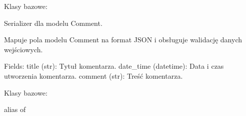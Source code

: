 \documentclass[letterpaper,11pt,polish]{sphinxmanual}
\begin{document}
\begin{fulllineitems}
\label{\detokenize{mainApp:mainApp.serializers.CommentSerializer}}
\pysigstartsignatures
{}
\pysigstopsignatures
\sphinxAtStartPar
Klasy bazowe: 

\sphinxAtStartPar
Serializer dla modelu Comment.

\sphinxAtStartPar
Mapuje pola modelu Comment na format JSON i obsługuje walidację danych wejściowych.

\sphinxAtStartPar
Fields:
\sphinxhyphen{} title (str): Tytuł komentarza.
\sphinxhyphen{} date\_time (datetime): Data i czas utworzenia komentarza.
\sphinxhyphen{} comment (str): Treść komentarza.

\begin{fulllineitems}
\label{\detokenize{mainApp:mainApp.serializers.CommentSerializer.Meta}}
\pysigstartsignatures
{}
\pysigstopsignatures
\sphinxAtStartPar
Klasy bazowe: 

\begin{fulllineitems}
\label{\detokenize{mainApp:mainApp.serializers.CommentSerializer.Meta.fields}}
\pysigstartsignatures
{}
\pysigstopsignatures
\end{fulllineitems}


\begin{fulllineitems}
\label{\detokenize{mainApp:mainApp.serializers.CommentSerializer.Meta.model}}
\pysigstartsignatures
{}
\pysigstopsignatures
\sphinxAtStartPar
alias of {\hyperref[\detokenize{mainApp:mainApp.models.Comment}]{}}

\end{fulllineitems}


\end{fulllineitems}


\end{fulllineitems}
\end{document}
